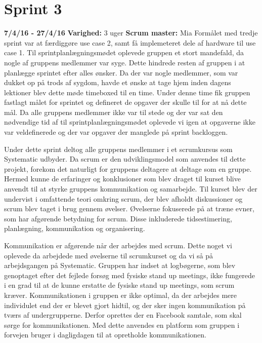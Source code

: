 	\section{Sprint 3}
	\textbf{7/4/16 - 27/4/16}\newline
	\textbf{Varighed: }3 uger \newline
	\textbf{Scrum master: }Mia \newline \newline
	Formålet med tredje sprint var at færdiggøre use case 2, samt få implemeteret dele af hardware til use case 1. Til sprintplanlægningsmødet oplevede gruppen et stort mandefald, da nogle af gruppens medlemmer var syge. Dette hindrede resten af gruppen i at planlægge sprintet efter alles ønsker. Da der var nogle medlemmer, som var dukket op på trods af sygdom, havde et ønske at tage hjem inden dagens lektioner blev dette møde timeboxed til en time. Under denne time fik gruppen fastlagt målet for sprintet og defineret de opgaver der skulle til for at nå dette mål. Da alle gruppens medlemmer ikke var til stede og der var sat den nødvendige tid af til sprintplanlægningsmødet oplevede vi igen at opgaverne ikke var veldefinerede og der var opgaver der manglede på sprint backloggen. \newline
	
	Under dette sprint deltog alle gruppens medlemmer i et scrumkursus som Systematic udbyder. Da scrum er den udviklingsmodel som anvendes til dette projekt, forekom det naturligt for gruppens deltagere at deltage som en gruppe. Hermed kunne de erfaringer og konklusioner som blev draget til kurset blive anvendt til at styrke gruppens kommunikation og samarbejde. 
	Til kurset blev der undervist i omfattende teori omkring scrum, der blev afholdt diskussioner og scrum blev taget i brug gennem øvelser. Øvelserne fokuserede på at træne evner, som har afgørende betydning for scrum. Disse inkluderede tidsestimering, planlægning, kommunikation og organisering. \newline
	
	Kommunikation er afgørende når der arbejdes med scrum. Dette noget vi oplevede da arbejdede med øvelserne til scrumkurset og da vi så på arbejdsgangen på Systematic. Gruppen har indset at logbøgerne, som blev genoptaget efter det fejlede forsøg med fysiske stand up meetings, ikke fungerede i en grad til at de kunne erstatte de fysiske stand up meetings, som scrum kræver. Kommunikationen i gruppen er ikke optimal, da der arbejdes mere individulet end der er blevet gjort hidtil, og der sker ingen kommunikation på tværs af undergrupperne. Derfor oprettes der en Facebook samtale, som skal sørge for kommunikationen. Med dette anvendes en platform som gruppen i forvejen bruger i dagligdagen til at opretholde kommunikationen.  \newline 
	
